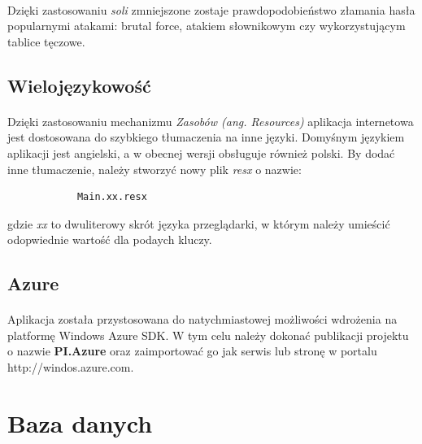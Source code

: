 \paragraph{} %
\label{par:}
Dzięki zastosowaniu \textit{soli} zmniejszone zostaje prawdopodobieństwo złamania hasła popularnymi atakami: brutal force, atakiem słownikowym czy wykorzystującym tablice tęczowe.


\subsection{Wielojęzykowość} %
\label{sub:wieloj_zykowo_}
\paragraph{} %
\label{par:}
Dzięki zastosowaniu mechanizmu \textit{Zasobów (ang. Resources)} aplikacja internetowa jest dostosowana do szybkiego tłumaczenia na inne języki. Domyśnym językiem aplikacji jest angielski, a w obecnej wersji obsługuje również polski. By dodać inne tłumaczenie, należy stworzyć nowy plik \textit{resx} o nazwie:

\begin{lstlisting}
			Main.xx.resx
\end{lstlisting}

\noindent
gdzie \textit{xx} to dwuliterowy skrót języka przeglądarki, w którym należy umieścić odopwiednie wartość dla podaych kluczy.

\subsection{Azure} %
\label{sub:azure}
\paragraph{} %
\label{par:}
Aplikacja została przystosowana do natychmiastowej możliwości wdrożenia na platformę Windows Azure SDK. W tym celu należy dokonać publikacji projektu o nazwie \textbf{PI.Azure} oraz zaimportować go jak serwis lub stronę w portalu http://windos.azure.com.

\section{Baza danych} %
\label{sec:baza_danych}
